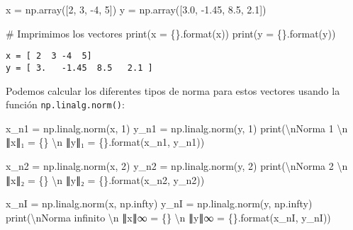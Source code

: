 \documentclass[
  letterpaper,
  DIV=11,
  numbers=noendperiod]{scrreprt}
\newenvironment{Shaded}{\begin{snugshade}}{\end{snugshade}}
\newcommand{\BuiltInTok}[1]{\textcolor[rgb]{0.00,0.23,0.31}{#1}}
\newcommand{\CharTok}[1]{\textcolor[rgb]{0.13,0.47,0.30}{#1}}
\newcommand{\CommentTok}[1]{\textcolor[rgb]{0.37,0.37,0.37}{#1}}
\newcommand{\DecValTok}[1]{\textcolor[rgb]{0.68,0.00,0.00}{#1}}
\newcommand{\FloatTok}[1]{\textcolor[rgb]{0.68,0.00,0.00}{#1}}
\newcommand{\NormalTok}[1]{\textcolor[rgb]{0.00,0.23,0.31}{#1}}
\newcommand{\OperatorTok}[1]{\textcolor[rgb]{0.37,0.37,0.37}{#1}}
\newcommand{\SpecialCharTok}[1]{\textcolor[rgb]{0.37,0.37,0.37}{#1}}
\newcommand{\StringTok}[1]{\textcolor[rgb]{0.13,0.47,0.30}{#1}}
\begin{document}
\begin{Shaded}
\begin{Highlighting}[]
\NormalTok{x }\OperatorTok{=}\NormalTok{ np.array([}\DecValTok{2}\NormalTok{, }\DecValTok{3}\NormalTok{, }\OperatorTok{{-}}\DecValTok{4}\NormalTok{, }\DecValTok{5}\NormalTok{]) }
\NormalTok{y }\OperatorTok{=}\NormalTok{ np.array([}\FloatTok{3.0}\NormalTok{, }\OperatorTok{{-}}\FloatTok{1.45}\NormalTok{, }\FloatTok{8.5}\NormalTok{, }\FloatTok{2.1}\NormalTok{])}

\CommentTok{\# Imprimimos los vectores}
\BuiltInTok{print}\NormalTok{(}\StringTok{\textquotesingle{}x = }\SpecialCharTok{\{\}}\StringTok{\textquotesingle{}}\NormalTok{.}\BuiltInTok{format}\NormalTok{(x))}
\BuiltInTok{print}\NormalTok{(}\StringTok{\textquotesingle{}y = }\SpecialCharTok{\{\}}\StringTok{\textquotesingle{}}\NormalTok{.}\BuiltInTok{format}\NormalTok{(y))}
\end{Highlighting}
\end{Shaded}

\begin{verbatim}
x = [ 2  3 -4  5]
y = [ 3.   -1.45  8.5   2.1 ]
\end{verbatim}

Podemos calcular los diferentes tipos de norma para estos vectores
usando la función \texttt{np.linalg.norm()}:

\begin{Shaded}
\begin{Highlighting}[]
\NormalTok{x\_n1 }\OperatorTok{=}\NormalTok{ np.linalg.norm(x, }\DecValTok{1}\NormalTok{)}
\NormalTok{y\_n1 }\OperatorTok{=}\NormalTok{ np.linalg.norm(y, }\DecValTok{1}\NormalTok{)}
\BuiltInTok{print}\NormalTok{(}\StringTok{\textquotesingle{}}\CharTok{\textbackslash{}n}\StringTok{Norma 1 }\CharTok{\textbackslash{}n}\StringTok{ ∥x∥₁ = }\SpecialCharTok{\{\}}\StringTok{ }\CharTok{\textbackslash{}n}\StringTok{ ∥y∥₁ = }\SpecialCharTok{\{\}}\StringTok{\textquotesingle{}}\NormalTok{.}\BuiltInTok{format}\NormalTok{(x\_n1, y\_n1))}

\NormalTok{x\_n2 }\OperatorTok{=}\NormalTok{ np.linalg.norm(x, }\DecValTok{2}\NormalTok{)}
\NormalTok{y\_n2 }\OperatorTok{=}\NormalTok{ np.linalg.norm(y, }\DecValTok{2}\NormalTok{)}
\BuiltInTok{print}\NormalTok{(}\StringTok{\textquotesingle{}}\CharTok{\textbackslash{}n}\StringTok{Norma 2 }\CharTok{\textbackslash{}n}\StringTok{ ∥x∥₂ = }\SpecialCharTok{\{\}}\StringTok{ }\CharTok{\textbackslash{}n}\StringTok{ ∥y∥₂ = }\SpecialCharTok{\{\}}\StringTok{\textquotesingle{}}\NormalTok{.}\BuiltInTok{format}\NormalTok{(x\_n2, y\_n2))}

\NormalTok{x\_nI }\OperatorTok{=}\NormalTok{ np.linalg.norm(x, np.infty)}
\NormalTok{y\_nI }\OperatorTok{=}\NormalTok{ np.linalg.norm(y, np.infty)}
\BuiltInTok{print}\NormalTok{(}\StringTok{\textquotesingle{}}\CharTok{\textbackslash{}n}\StringTok{Norma infinito }\CharTok{\textbackslash{}n}\StringTok{ ∥x∥∞ = }\SpecialCharTok{\{\}}\StringTok{ }\CharTok{\textbackslash{}n}\StringTok{ ∥y∥∞ = }\SpecialCharTok{\{\}}\StringTok{\textquotesingle{}}\NormalTok{.}\BuiltInTok{format}\NormalTok{(x\_nI, y\_nI))}
\end{Highlighting}
\end{Shaded}
\end{document}
